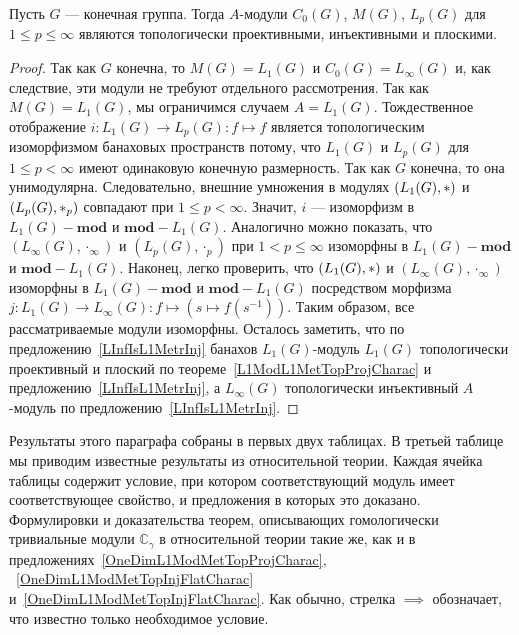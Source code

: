 \begin{proposition}\label{StdModFinGrL1MGTopInjProjFlatCharac} Пусть $G$ ---
конечная группа. Тогда $A$-модули $C_0(G)$, $M(G)$, $L_p(G)$ для 
$1\leq p\leq \infty$ являются топологически проективными, 
инъективными и плоскими.
\end{proposition} 
\begin{proof}
Так как $G$ конечна, то $M(G)=L_1(G)$ и $C_0(G)=L_\infty(G)$ и, как следствие,
эти модули не требуют отдельного рассмотрения. Так как $M(G)=L_1(G)$, мы
ограничимся случаем $A=L_1(G)$. Тождественное отображение $i:L_1(G)\to
L_p(G):f\mapsto f$ является топологическим изоморфизмом банаховых пространств
потому, что $L_1(G)$ и $L_p(G)$ для $1\leq p<\infty$ имеют одинаковую конечную
размерность. Так как $G$ конечна, то она унимодулярна. Следовательно, внешние
умножения в модулях $(L_1(G),\ast)$ и $(L_p(G),\ast_p)$ совпадают при
$1\leq p<\infty$. Значит, $i$ --- изоморфизм в $L_1(G)-\mathbf{mod}$ и
$\mathbf{mod}-L_1(G)$. Аналогично можно показать, что
$(L_\infty(G),\cdot_\infty)$ и $(L_p(G),\cdot_p)$ при $1<p\leq\infty$ изоморфны
в $L_1(G)-\mathbf{mod}$ и $\mathbf{mod}-L_1(G)$. Наконец, легко проверить, что
$(L_1(G),\ast)$ и $(L_\infty(G),\cdot_\infty)$ изоморфны в
$L_1(G)-\mathbf{mod}$ и $\mathbf{mod}-L_1(G)$ посредством морфизма 
$j:L_1(G)\to L_\infty(G):f\mapsto(s\mapsto f(s^{-1}))$. 
Таким образом, все рассматриваемые
модули изоморфны. Осталось заметить, что по предложению~\ref{LInfIsL1MetrInj}
банахов $L_1(G)$-модуль $L_1(G)$ топологически проективный и плоский по
теореме~\ref{L1ModL1MetTopProjCharac} и предложению~\ref{LInfIsL1MetrInj}, а
$L_\infty(G)$ топологически инъективный $A$-модуль по
предложению~\ref{LInfIsL1MetrInj}.
\end{proof}

Результаты этого параграфа собраны в первых двух таблицах. В третьей таблице мы
приводим известные результаты из относительной теории. Каждая ячейка таблицы
содержит условие, при котором соответствующий модуль имеет соответствующее
свойство, и предложения в которых это доказано. Формулировки и доказательства
теорем, описывающих гомологически тривиальные модули $\mathbb{C}_\gamma$ в
относительной теории такие же, как и в
предложениях~\ref{OneDimL1ModMetTopProjCharac},
~\ref{OneDimL1ModMetTopInjFlatCharac}
и~\ref{OneDimL1ModMetTopInjFlatCharac}. Как обычно, стрелка $\implies$
обозначает, что известно только необходимое условие. 

